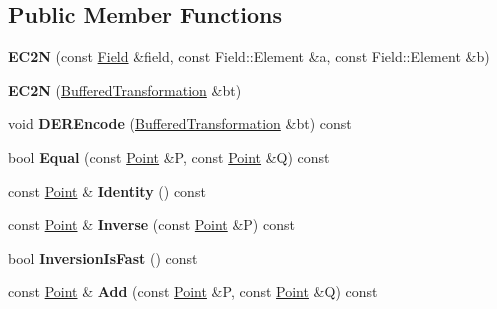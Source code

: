\subsection*{Public Member Functions}
\begin{DoxyCompactItemize}
\item 
\hypertarget{class_e_c2_n_a8f8084f4fa2f0658417b64b55b08543f}{
{\bfseries EC2N} (const \hyperlink{class_g_f2_n_p}{Field} \&field, const Field::Element \&a, const Field::Element \&b)}
\label{class_e_c2_n_a8f8084f4fa2f0658417b64b55b08543f}

\item 
\hypertarget{class_e_c2_n_a92b1fd124cd5babd51d0886668336b7e}{
{\bfseries EC2N} (\hyperlink{class_buffered_transformation}{BufferedTransformation} \&bt)}
\label{class_e_c2_n_a92b1fd124cd5babd51d0886668336b7e}

\item 
\hypertarget{class_e_c2_n_ae90045af196aff7edc035a6051f1640f}{
void {\bfseries DEREncode} (\hyperlink{class_buffered_transformation}{BufferedTransformation} \&bt) const }
\label{class_e_c2_n_ae90045af196aff7edc035a6051f1640f}

\item 
\hypertarget{class_e_c2_n_aa57b5f87867b5acee8bf7f51d140c0d1}{
bool {\bfseries Equal} (const \hyperlink{struct_e_c2_n_point}{Point} \&P, const \hyperlink{struct_e_c2_n_point}{Point} \&Q) const }
\label{class_e_c2_n_aa57b5f87867b5acee8bf7f51d140c0d1}

\item 
\hypertarget{class_e_c2_n_ac1682582ed2d25b3609699158800430e}{
const \hyperlink{struct_e_c2_n_point}{Point} \& {\bfseries Identity} () const }
\label{class_e_c2_n_ac1682582ed2d25b3609699158800430e}

\item 
\hypertarget{class_e_c2_n_aa81b05e94a3e3e1856266f37686c3e96}{
const \hyperlink{struct_e_c2_n_point}{Point} \& {\bfseries Inverse} (const \hyperlink{struct_e_c2_n_point}{Point} \&P) const }
\label{class_e_c2_n_aa81b05e94a3e3e1856266f37686c3e96}

\item 
\hypertarget{class_e_c2_n_ab432b43f411b4bb3eafa64087fae1ff0}{
bool {\bfseries InversionIsFast} () const }
\label{class_e_c2_n_ab432b43f411b4bb3eafa64087fae1ff0}

\item 
\hypertarget{class_e_c2_n_a8e18435104858eb87e34029edd092ec0}{
const \hyperlink{struct_e_c2_n_point}{Point} \& {\bfseries Add} (const \hyperlink{struct_e_c2_n_point}{Point} \&P, const \hyperlink{struct_e_c2_n_point}{Point} \&Q) const }
\label{class_e_c2_n_a8e18435104858eb87e34029edd092ec0}


\end{DoxyCompactItemize}

